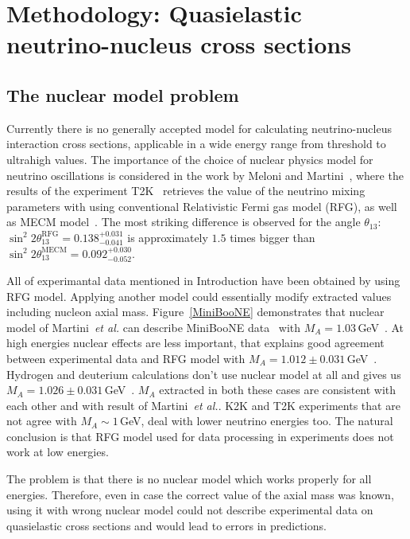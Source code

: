\section{Methodology: Quasielastic neutrino-nucleus cross sections}
\subsection{The nuclear model problem}
Currently there is no generally accepted model for calculating neutrino-nucleus interaction cross sections, applicable in a wide energy range from threshold to ultrahigh values. The importance of the choice of nuclear physics model for neutrino oscillations is considered in the work by Meloni and Martini~\cite{Meloni:2012fq}, where the results of the experiment T2K~\cite{Abe:2011sj,Abe:2012gx} retrieves the value of the neutrino mixing parameters with using conventional Relativistic Fermi gas model (RFG), as well as MECM model~\cite{Martini:2009uj}. The most striking difference is observed for the angle $\theta_{13}$: $\sin^{2}2\theta_{13}^{\textrm{RFG}}=0.138^{+0.031}_{-0.041}$ is approximately $1.5$ times bigger than $\sin^{2}2\theta_{13}^{\textrm{MECM}}=0.092^{+0.030}_{-0.052}$.

All of experimantal data mentioned in Introduction have been obtained by using RFG model. Applying another model could essentially modify extracted values including nucleon axial mass. Figure~\ref{MiniBooNE} demonstrates that nuclear model of Martini~\textit{et al.} can describe MiniBooNE data~\cite{AguilarArevalo:2010zc} with $M_{A}=1.03$\,GeV~\cite{Martini:2011wp}. At high energies nuclear effects are less important, that explains good agreement between experimental data and RFG model with $M_{A}=1.012\pm{0.031}$\,GeV~\cite{Kuzmin:2014}. Hydrogen and deuterium calculations don't use nuclear model at all and gives us $M_{A}=1.026\pm{0.031}$\,GeV~\cite{Kuzmin:2014}. $M_{A}$ extracted in both these cases are consistent with each other and with result of Martini~\textit{et al.}. K2K and T2K experiments that are not agree with $M_{A}\sim1$\,GeV, deal with lower neutrino energies too. The natural conclusion is that RFG model used for data processing in experiments does not work at low energies.

The problem is that there is no nuclear model which works properly for all energies. Therefore, even in case the correct value of the axial mass was known, using it with wrong nuclear model could not describe experimental data on quasielastic cross sections and would lead to errors in predictions.

